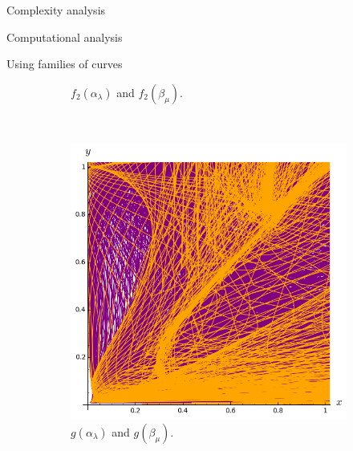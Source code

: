 \documentclass[11pt, a4paper, english, twoside, notitlepage, openright]{report}
\begin{document}
\begin{chapter}{Complexity analysis}
\begin{section}{Computational analysis}
\begin{subsection}{Using families of curves}
\begin{figure}
\begin{subfigure}{.45\linewidth}
\vspace{-0.4cm}\caption{$f_2(\alpha_{\lambda})$ and $f_2(\beta_{\mu})$.\label{fig:3curves1}}
\end{subfigure}\\[1ex]
\vspace{-0.2cm}
	
\hspace{0.4cm}
\begin{subfigure}{.45\linewidth}\centering
\includegraphics[width=1\textwidth]{plots/ch5_24_1curves2.png}
\vspace{-0.4cm}\caption{$g(\alpha_{\lambda})$ and $g(\beta_{\mu})$.\label{fig:1curves2}}
\end{subfigure}
\begin{subfigure}{.45\linewidth}\centering

\end{subfigure}
\end{figure}
\end{subsection}
\end{section}
\end{chapter}
\end{document}
